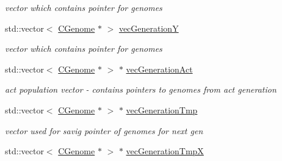 \begin{DoxyCompactItemize}
\begin{DoxyCompactList}\small\item\em vector which contains pointer for genomes \item\end{DoxyCompactList}\item 
\hypertarget{classCGeneticAlgorithm_a5afa004faf496ff623cfbfbf657af866}{
std::vector$<$ \hyperlink{classCGenome}{CGenome} $\ast$ $>$ \hyperlink{classCGeneticAlgorithm_a5afa004faf496ff623cfbfbf657af866}{vecGenerationY}}
\label{classCGeneticAlgorithm_a5afa004faf496ff623cfbfbf657af866}

\begin{DoxyCompactList}\small\item\em vector which contains pointer for genomes \item\end{DoxyCompactList}\item 
\hypertarget{classCGeneticAlgorithm_a5108f3537531d05dbac2163e1b3b0428}{
std::vector$<$ \hyperlink{classCGenome}{CGenome} $\ast$ $>$ $\ast$ \hyperlink{classCGeneticAlgorithm_a5108f3537531d05dbac2163e1b3b0428}{vecGenerationAct}}
\label{classCGeneticAlgorithm_a5108f3537531d05dbac2163e1b3b0428}

\begin{DoxyCompactList}\small\item\em act population vector -\/ contains pointers to genomes from act generation \item\end{DoxyCompactList}\item 
\hypertarget{classCGeneticAlgorithm_aa83ddd794f6b65a0d8207437a267792d}{
std::vector$<$ \hyperlink{classCGenome}{CGenome} $\ast$ $>$ $\ast$ \hyperlink{classCGeneticAlgorithm_aa83ddd794f6b65a0d8207437a267792d}{vecGenerationTmp}}
\label{classCGeneticAlgorithm_aa83ddd794f6b65a0d8207437a267792d}

\begin{DoxyCompactList}\small\item\em vector used for savig pointer of genomes for next gen \item\end{DoxyCompactList}\item 
\hypertarget{classCGeneticAlgorithm_ad6a2697a3a8c0b583e4f1c320045d901}{
std::vector$<$ \hyperlink{classCGenome}{CGenome} $\ast$ $>$ $\ast$ \hyperlink{classCGeneticAlgorithm_ad6a2697a3a8c0b583e4f1c320045d901}{vecGenerationTmpX}}
\label{classCGeneticAlgorithm_ad6a2697a3a8c0b583e4f1c320045d901}


\end{DoxyCompactItemize}
